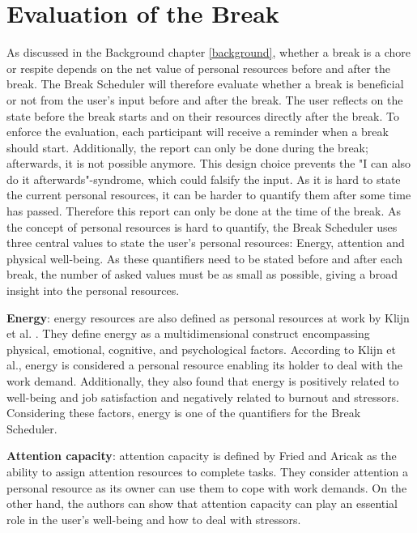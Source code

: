 \documentclass{hasel_thesis}
\begin{document}
\section{Evaluation of the Break} \label{evaluation_break}
As discussed in the Background chapter \ref{background}, whether a break is a chore or respite depends on the net value of personal resources before and after the break. The Break Scheduler will therefore evaluate whether a break is beneficial or not from the user's input before and after the break. The user reflects on the state before the break starts and on their resources directly after the break. To enforce the evaluation, each participant will receive a reminder when a break should start. Additionally, the report can only be done during the break; afterwards, it is not possible anymore. This design choice prevents the "I can also do it afterwards"-syndrome, which could falsify the input. As it is hard to state the current personal resources, it can be harder to quantify them after some time has passed. Therefore this report can only be done at the time of the break. As the concept of personal resources is hard to quantify, the Break Scheduler uses three central values to state the user's personal resources: Energy, attention and physical well-being. As these quantifiers need to be stated before and after each break, the number of asked values must be as small as possible, giving a broad insight into the personal resources. 

\textbf{Energy}: energy resources are also defined as personal resources at work by Klijn et al. \cite{klijn.2021}. They define energy as a multidimensional construct encompassing physical, emotional, cognitive, and psychological factors. According to Klijn et al., energy is considered a personal resource enabling its holder to deal with the work demand. Additionally, they also found that energy is positively related to well-being and job satisfaction and negatively related to burnout and stressors. Considering these factors, energy is one of the quantifiers for the Break Scheduler.

\textbf{Attention capacity}: attention capacity is defined by Fried and Aricak \cite{Fried2014} as the ability to assign attention resources to complete tasks. They consider attention a personal resource as its owner can use them to cope with work demands. On the other hand, the authors can show that attention capacity can play an essential role in the user's well-being and how to deal with stressors.
\end{document}
